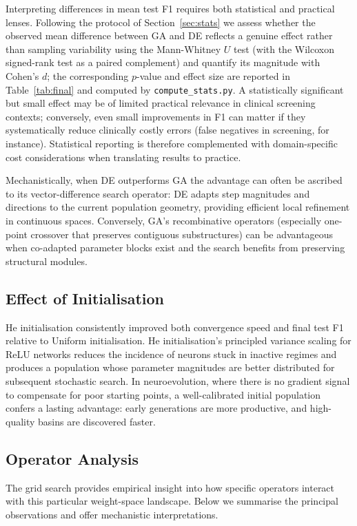 \documentclass[12pt, a4paper]{article}
\begin{document}
Interpreting differences in mean test F1 requires both statistical and practical lenses. Following the protocol of Section~\ref{sec:stats} we assess whether the observed mean difference between GA and DE reflects a genuine effect rather than sampling variability using the Mann-Whitney $U$ test (with the Wilcoxon signed-rank test as a paired complement) and quantify its magnitude with Cohen's $d$; the corresponding $p$-value and effect size are reported in Table~\ref{tab:final} and computed by \texttt{compute\_stats.py}. A statistically significant but small effect may be of limited practical relevance in clinical screening contexts; conversely, even small improvements in F1 can matter if they systematically reduce clinically costly errors (false negatives in screening, for instance). Statistical reporting is therefore complemented with domain-specific cost considerations when translating results to practice.

Mechanistically, when DE outperforms GA the advantage can often be ascribed to its vector-difference search operator: DE adapts step magnitudes and directions to the current population geometry, providing efficient local refinement in continuous spaces. Conversely, GA's recombinative operators (especially one-point crossover that preserves contiguous substructures) can be advantageous when co-adapted parameter blocks exist and the search benefits from preserving structural modules.

\subsection{Effect of Initialisation}
He initialisation consistently improved both convergence speed and final test F1 relative to Uniform initialisation. He initialisation's principled variance scaling for ReLU networks reduces the incidence of neurons stuck in inactive regimes and produces a population whose parameter magnitudes are better distributed for subsequent stochastic search. In neuroevolution, where there is no gradient signal to compensate for poor starting points, a well-calibrated initial population confers a lasting advantage: early generations are more productive, and high-quality basins are discovered faster.

\subsection{Operator Analysis}
The grid search provides empirical insight into how specific operators interact with this particular weight-space landscape. Below we summarise the principal observations and offer mechanistic interpretations.
\end{document}
